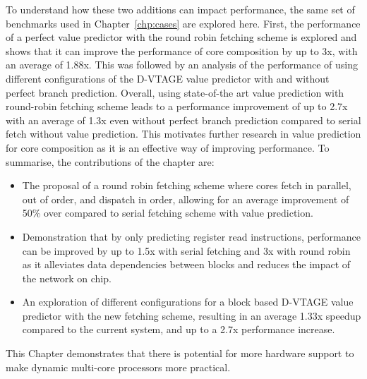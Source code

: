 To understand how these two additions can impact performance, the same set of benchmarks used in Chapter~\ref{chp:cases} are explored here.
First, the performance of a perfect value predictor with the round robin fetching scheme is explored and shows that it can improve the performance of core composition by up to 3x, with an average of 1.88x.
This was followed by an analysis of the performance of using different configurations of the D-VTAGE value predictor with and without perfect branch prediction.
Overall, using state-of-the art value prediction with round-robin fetching scheme leads to a performance improvement of up to 2.7x with an average of 1.3x even without perfect branch prediction compared to serial fetch without value prediction.
This motivates further research in value prediction for core composition as it is an effective way of improving performance.
To summarise, the contributions of the chapter are:
\vspace{-0.5em}
\begin{itemize}
\item The proposal of a round robin fetching scheme where cores fetch in parallel, out of order, and dispatch in order, allowing for an average improvement of 50\% over compared to serial fetching scheme with value prediction.
\vspace{-0.5em}
\item Demonstration that by only predicting register read instructions, performance can be improved by up to 1.5x with serial fetching and 3x with round robin as it alleviates data dependencies between blocks and reduces the impact of the network on chip.
\vspace{-0.5em}
\item An exploration of different configurations for a block based D-VTAGE value predictor with the new fetching scheme, resulting in an average 1.33x speedup compared to the current system, and up to a 2.7x performance increase.
\end{itemize}

This Chapter demonstrates that there is potential for more hardware support to make dynamic multi-core processors more practical.
